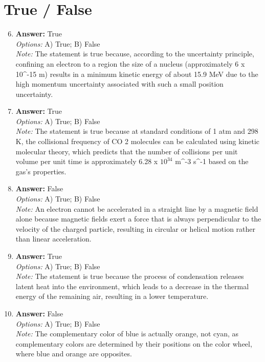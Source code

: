 \documentclass[12pt]{article}
\begin{document}
\section*{True / False}
\begin{enumerate}[label=\arabic*.]
\setcounter{enumi}{5}
\item \textbf{Answer:} True
\\ \textit{Options:} A) True; B) False
\\ \textit{Note:} The statement is true because, according to the uncertainty principle, confining an electron to a region the size of a nucleus (approximately 6 x 10^-15 m) results in a minimum kinetic energy of about 15.9 MeV due to the high momentum uncertainty associated with such a small position uncertainty.
\item \textbf{Answer:} True
\\ \textit{Options:} A) True; B) False
\\ \textit{Note:} The statement is true because at standard conditions of 1 atm and 298 K, the collisional frequency of CO 2 molecules can be calculated using kinetic molecular theory, which predicts that the number of collisions per unit volume per unit time is approximately 6.28 x $10^34$ m^-3 s^-1 based on the gas's properties.
\item \textbf{Answer:} False
\\ \textit{Options:} A) True; B) False
\\ \textit{Note:} An electron cannot be accelerated in a straight line by a magnetic field alone because magnetic fields exert a force that is always perpendicular to the velocity of the charged particle, resulting in circular or helical motion rather than linear acceleration.
\item \textbf{Answer:} True
\\ \textit{Options:} A) True; B) False
\\ \textit{Note:} The statement is true because the process of condensation releases latent heat into the environment, which leads to a decrease in the thermal energy of the remaining air, resulting in a lower temperature.
\item \textbf{Answer:} False
\\ \textit{Options:} A) True; B) False
\\ \textit{Note:} The complementary color of blue is actually orange, not cyan, as complementary colors are determined by their positions on the color wheel, where blue and orange are opposites.
\end{enumerate}
\end{document}
